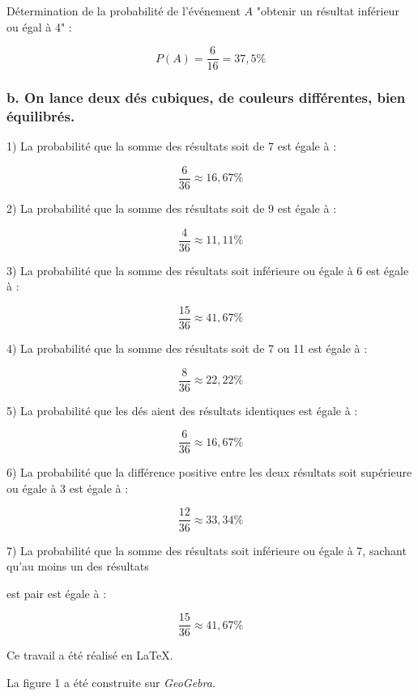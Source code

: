\documentclass[10pt]{article}
\begin{document}
Détermination de la probabilité de l'événement $A$ "obtenir un résultat inférieur ou égal à 4" :

$$P(A)=\frac{6}{16}=37,5\%$$

\subsubsection*{b. On lance deux dés cubiques, de couleurs différentes, bien équilibrés.}

\hspace{15pt}1) La probabilité que la somme des résultats soit de 7 est égale à :

$$\frac{6}{36}\approx 16,67\%$$

2) La probabilité que la somme des résultats soit de 9 est égale à :

$$\frac{4}{36}\approx 11,11\%$$

3) La probabilité que la somme des résultats soit inférieure ou égale à 6 est égale à :

$$\frac{15}{36}\approx 41,67\%$$

4) La probabilité que la somme des résultats soit de 7 ou 11 est égale à :

$$\frac{8}{36}\approx 22,22\%$$

5) La probabilité que les dés aient des résultats identiques est égale à :

$$\frac{6}{36}\approx 16,67\%$$

6) La probabilité que la différence positive entre les deux résultats soit supérieure ou égale à 3 est égale à :

$$\frac{12}{36}\approx 33,34\%$$

7) La probabilité que la somme des résultats soit inférieure ou égale à 7, sachant qu'au moins un des résultats

\hspace{12pt}est pair est égale à :

$$\frac{15}{36}\approx 41,67\%$$

\begin{center}
\vspace{1cm}Ce travail a été réalisé en \LaTeX . \vspace{0.2cm}

La figure 1 a été construite sur \textit{GeoGebra}.\vspace{0.2cm}
\end{center}
\end{document}
